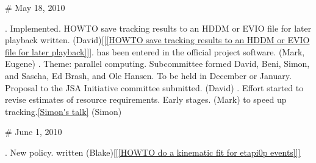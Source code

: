 # May 18, 2010 

. Implemented. HOWTO save tracking results to an HDDM or EVIO file for later playback written. (David)\ref{[[HOWTO save tracking results to an HDDM or EVIO file for later playback]]}.
 has been entered in the official project software. (Mark, Eugene)
. Theme: parallel computing. Subcommittee formed David, Beni, Simon, and Sascha, Ed Brash, and Ole Hansen. To be held in December or January. Proposal to the JSA Initiative committee submitted. (David)
. Effort started to revise estimates of resource requirements. Early stages. (Mark)
 to speed up tracking.\ref{Simon's talk} (Simon)

# June 1, 2010

. New policy.
 written (Blake)\ref{[[HOWTO do a kinematic fit for etapi0p events]]}

